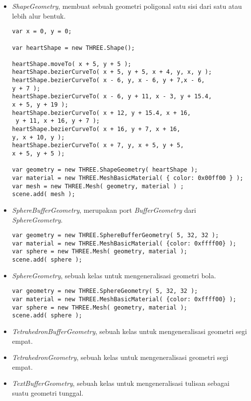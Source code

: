 \begin{itemize}
\begin{itemize}
	\item {\it ShapeGeometry}, membuat sebuah geometri poligonal satu sisi dari satu atau lebih alur bentuk.
	
\begin{lstlisting}
var x = 0, y = 0;

var heartShape = new THREE.Shape();

heartShape.moveTo( x + 5, y + 5 );
heartShape.bezierCurveTo( x + 5, y + 5, x + 4, y, x, y );
heartShape.bezierCurveTo( x - 6, y, x - 6, y + 7,x - 6, 
y + 7 );
heartShape.bezierCurveTo( x - 6, y + 11, x - 3, y + 15.4, 
x + 5, y + 19 );
heartShape.bezierCurveTo( x + 12, y + 15.4, x + 16,
 y + 11, x + 16, y + 7 );
heartShape.bezierCurveTo( x + 16, y + 7, x + 16, 
y, x + 10, y );
heartShape.bezierCurveTo( x + 7, y, x + 5, y + 5, 
x + 5, y + 5 );

var geometry = new THREE.ShapeGeometry( heartShape );
var material = new THREE.MeshBasicMaterial( { color: 0x00ff00 } );
var mesh = new THREE.Mesh( geometry, material ) ;
scene.add( mesh );
\end{lstlisting}

	\item {\it SphereBufferGeometry}, merupakan port {\it BufferGeometry} dari {\it SphereGeometry}.
	
\begin{lstlisting}
var geometry = new THREE.SphereBufferGeometry( 5, 32, 32 );
var material = new THREE.MeshBasicMaterial( {color: 0xffff00} );
var sphere = new THREE.Mesh( geometry, material );
scene.add( sphere );
\end{lstlisting}

	\item {\it SphereGeometry}, sebuah kelas untuk mengeneralisasi geometri bola.
	
\begin{lstlisting}
var geometry = new THREE.SphereGeometry( 5, 32, 32 );
var material = new THREE.MeshBasicMaterial( {color: 0xffff00} );
var sphere = new THREE.Mesh( geometry, material );
scene.add( sphere );
\end{lstlisting}

	\item {\it TetrahedronBufferGeometry}, sebuah kelas untuk mengeneralisasi geometri segi empat.
	
	\item {\it TetrahedronGeometry}, sebuah kelas untuk mengeneralisasi geometri segi empat.
	
	\item {\it TextBufferGeometry}, sebuah kelas untuk mengeneralisasi tulisan sebagai suatu geometri tunggal.
	

\end{itemize}
\end{itemize}
